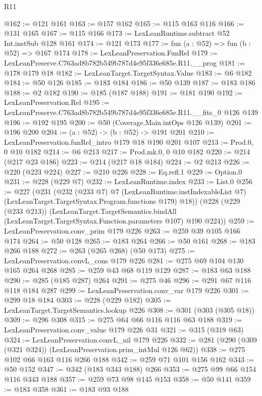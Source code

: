 \begin{lexlean}{R11}
\begin{coremodule}
@162 := @121 @161
@163 := @157 @162
@165 := @115 @163 @116
@166 := @131 @165
@167 := @115 @166
@173 := LexLeanRuntime.subtract @52 Int.instSub @128 @161
@174 := @121 @173
@177 := fun (a : @52) => fun (b : @52) => @167 @174
@178 := LexLeanPreservation.FunRel
@179 := LexLeanPreserve.C763ad8b782b549b787d4e95f336e685e.R11.__prog
@181 := @178 @179 @18
@182 := LexLeanTarget.TargetSyntax.Value
@183 := @6 @182
@184 := @50 @126
@185 := @183 @184
@186 := @50 @139
@187 := @183 @186
@188 := @2 @182
@190 := @185 (@187 @188)
@191 := @181 @190
@192 := LexLeanPreservation.Rel
@195 := LexLeanPreserve.C763ad8b782b549b787d4e95f336e685e.R11.__fits_0 @126 @139
@196 := @192 @195
@200 := @50 (Coverage.Main.intOps @126 @139)
@201 := @196 @200
@204 := (a : @52) -> (b : @52) -> @191 @201
@210 := LexLeanPreservation.funRel_intro @179 @18 @190 @201 @107
@213 := Prod.{0, 0} @10 @182
@214 := @6 @213
@217 := Prod.mk.{0, 0} @10 @182
@220 := @214 (@217 @23 @186)
@223 := @214 (@217 @18 @184)
@224 := @2 @213
@226 := @220 (@223 @224)
@227 := @210 @226
@228 := Eq.refl.{1}
@229 := Option.{0}
@231 := @228 (@229 @7)
@232 := LexLeanRuntime.index
@233 := List.{0}
@256 := @227
    (@231
      (@232
        (@233 @7)
        @7
        (LexLeanRuntime.instIndexableList @7)
        (LexLeanTarget.TargetSyntax.Program.functions @179)
        @18))
    (@228
      (@229 (@233 @213))
      (LexLeanTarget.TargetSemantics.bindAll
        (LexLeanTarget.TargetSyntax.Function.parameters @107)
        @190
        @224))
@259 := LexLeanPreservation.conv_prim @179 @226
@263 := @259 @39 @105 @166 @174
@264 := @50 @128
@265 := @183 @264
@266 := @50 @161
@268 := @183 @266 @188
@272 := @263 (@265 @268) (@50 @173)
@275 := LexLeanPreservation.convL_cons @179 @226
@281 := @275 @69 @104 @130 @165 @264 @268
@285 := @259 @43 @68 @119 @129
@287 := @183 @63 @188
@290 := @285 (@185 @287) @264
@291 := @275 @46
@296 := @291 @67 @116 @118 @184 @287
@299 := LexLeanPreservation.conv_var @179 @226
@301 := @299 @18 @184
@303 := @228 (@229 @182)
@305 := LexLeanTarget.TargetSemantics.lookup @226
@308 := @301 (@303 (@305 @18))
@309 := @296 @308
@315 := @275 @64 @66 @116 @116 @63 @188
@319 := LexLeanPreservation.conv_value @179 @226 @31
@321 := @315 (@319 @63)
@324 := LexLeanPreservation.convL_nil @179 @226
@332 := @281 (@290 (@309 (@321 @324)) (LexLeanPreservation.prim_intMul @126 @62))
@338 := @275 @102 @66 @163 @116 @266 @188
@342 := @259 @71 @101 @156 @162
@343 := @50 @152
@347 := @342 (@183 @343 @188) @266
@353 := @275 @99 @66 @154 @116 @343 @188
@357 := @259 @73 @98 @145 @153
@358 := @50 @141
@359 := @183 @358
@361 := @183 @93 @188

\end{coremodule}
\end{lexlean}
